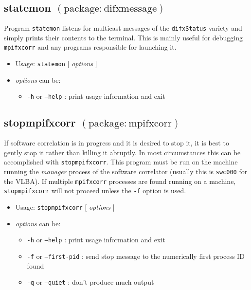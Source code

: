 
\subsection{statemon {\small $\mathrm{(package: difxmessage)}$}} \label{sec:statemon} 

Program {\tt statemon} listens for multicast messages of the {\tt difxStatus} variety and simply prints their contents to the terminal.
This is mainly useful for debugging {\tt mpifxcorr} and any programs responsible for launching it.

\begin{itemize}
\item[] Usage: {\tt statemon} $[$ {\em options} $]$ 
\item[] {\em options} can be:
\begin{itemize}
\item[] {\tt -h} or {\tt --help} : print usage information and exit
\end{itemize}
\end{itemize}











\subsection{stopmpifxcorr {\small $\mathrm{(package: mpifxcorr)}$}} \label{sec:stopmpifxcorr}

If software correlation is in progress and it is desired to stop it, it is best to gently stop it rather than killing it abruptly.
In most circumstances this can be accomplished with {\tt stopmpifxcorr}.
This program must be run on the machine running the {\em manager} process of the software correlator (usually this is {\tt swc000} for the VLBA).
If multiple {\tt mpifxcorr} processes are found running on a machine, {\tt stopmpifxcorr} will not proceed unless the
{\tt -f} option is used.

\begin{itemize}
\item[] Usage: {\tt stopmpifxcorr} $[$ {\em options} $]$
\item[] {\em options} can be:
\begin{itemize}
\item[] {\tt -h} or {\tt --help} : print usage information and exit
\item[] {\tt -f} or {\tt --first-pid} : send stop message to the numerically first process ID found
\item[] {\tt -q} or {\tt --quiet} : don't produce much output
\end{itemize}
\end{itemize}










